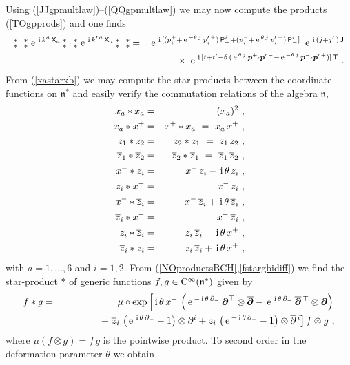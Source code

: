\documentclass[11pt,a4paper]{article}
\newcommand{\NOa}{\mbox{$\substack{\ast\\\ast}$}}       %
\newcommand{\mbf}[1]{{\boldsymbol {#1} }}
\def\ii{{\,{\rm i}\,}}
\def\CC{{\rm C}}
\def\P{{\sf P}}
\def\T{{\sf T}}
\def\X{{\sf X}}
\def\J{{\sf J}}
\def\mbp{{\mbf p}}
\def\mdell{{\mbf\partial}}
\def\mfn{{\mathfrak n}}
\def\nn{\nonumber}
\def\e{{\,\rm e}\,}
\def\bea{\begin{eqnarray}}
\def\eea{\end{eqnarray}}
\newcommand{\z}{\zeta}
\begin{document}
Using (\ref{JJgpmultlaw})--(\ref{QQgpmultlaw}) we may now compute the
products (\ref{TOgpprods}) and one finds
\bea
\NOa~~\NOa\,\e^{\ii k^a\,\X_a}\,\NOa\cdot\NOa\,\e^{\ii k^{\prime\,a}\,\X_a}
\,\NOa~~\NOa&=&\e^{\ii[(p_i^++\e^{-\theta\,j}\,p_i^{\prime\,+})\,
\P^i_++(p_i^-+\e^{\theta\,j}\,p_i^{\prime\,-})\,\P^i_-]}~
\e^{\ii(j+j'\,)\,\J}\nonumber\\ &&\times~
\e^{\ii[t+t'-\theta\,(\e^{\theta\,j}\,
\mbp^+\cdot\mbp^{\prime\,-}-\e^{-\theta\,j}\,
\mbp^-\cdot\mbp^{\prime\,+})]\,\T} \ .
\label{TOgpprodexpl}\eea
From (\ref{xastarxb}) we may compute the star-products between the
coordinate functions on $\mfn^*$ and easily verify the commutation
relations of the algebra $\mfn$,
\bea
x_a*x_a&=&(x_a)^2 \ , \nonumber\\x_a*x^+&=&x^+*x_a~=~x_a\,x^+ \ ,
\nonumber\\z_1*z_2&=&z_2*z_1~=~z_1\,z_2 \ , \nonumber\\
\overline{z}_1*\overline{z}_2&=&\overline{z}_2*\overline{z}_1
~=~\overline{z}_1\,\overline{z}_2 \ , \nonumber\\
x^-*z_i&=&x^-\,z_i-\ii\theta\,z_i \ , \nonumber\\
z_i*x^-&=&x^-\,z_i \ , \nonumber\\
x^-*\overline{z}_i&=&x^-\,\overline{z}_i+\ii\theta\,\overline{z}_i \ ,
\nonumber\\ \overline{z}_i*x^-&=&x^-\,\overline{z}_i \ , \nonumber\\
z_i*\overline{z}_i&=&z_i\,\overline{z}_i-\ii\theta\,x^+ \ , \nn\\
\overline{z}_i*z_i&=&z_i\,\overline{z}_i+\ii\theta\,x^+ \ ,
\label{TOcoordstarprods}\eea
with $a=1,\dots,6$ and $i=1,2$. From
(\ref{NOproductsBCH},\ref{fstargbidiff}) we find the star-product $*$
of generic functions $f,g\in\CC^{\infty}(\mfn^*)$ given by
\bea
f*g&=&\mu\circ\exp\left[\ii\theta\,x^+\,\left(\e^{-\ii\theta\,\partial_-}\,
\mdell^\top\otimes\overline{\mdell}-\e^{\ii\theta\,\partial_-}\,
{\overline{\mdell}}{}^{\,\top}\otimes\mdell\right)\right.\nonumber
\\ &&\qquad\qquad+\left.\overline{z}_i\,
\left(\e^{\ii\theta\,\partial_-}-1\right)\otimes
\partial^i+z_i\,\left(\e^{-\ii\theta\,\partial_-}-1\right)
\otimes\overline{\partial}{}^{\,i}\right]f\otimes g \ ,
\label{TOstargen}\eea
where $\mu(f\otimes g)=f\,g$ is the pointwise product. To second order
in the deformation parameter $\theta$ we obtain
\end{document}
